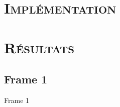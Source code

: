 

\section{\scshape Implémentation}

\section{\scshape Résultats}
\subsection{Frame 1}
\begin{frame}{Frame 1}

\end{frame}
